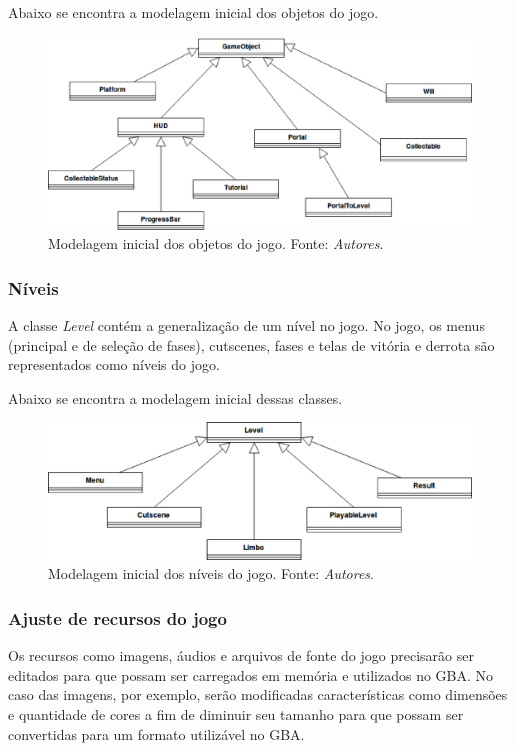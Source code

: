       Abaixo se encontra a modelagem inicial dos objetos do jogo.

      \begin{figure}[H]
        \centering \includegraphics[keepaspectratio=true,scale=0.6]{figuras/class-diagram-1.eps}
        \caption[Modelagem inicial dos objetos do jogo]
          {Modelagem inicial dos objetos do jogo. Fonte: \textit{Autores}.}
        \label{game-object-children}
      \end{figure}

    \subsubsection{Níveis}

      A classe \textit{Level} contém a generalização de um nível no jogo. No jogo, os menus (principal e de seleção de fases), cutscenes, fases e telas de vitória e derrota são representados como níveis do jogo.

      Abaixo se encontra a modelagem inicial dessas classes.

      \begin{figure}[H]
        \centering \includegraphics[keepaspectratio=true,scale=0.6]{figuras/class-diagram-2.eps}
        \caption[Modelagem inicial dos níveis do jogo]
          {Modelagem inicial dos níveis do jogo. Fonte: \textit{Autores}.}
        \label{game-object-levels}
      \end{figure}

    \subsubsection{Ajuste de recursos do jogo}

      Os recursos como imagens, áudios e arquivos de fonte do jogo precisarão ser editados para que possam ser carregados em memória e utilizados no GBA. No caso das imagens, por exemplo, serão modificadas características como dimensões e quantidade de cores a fim de diminuir seu tamanho para que possam ser convertidas para um formato utilizável no GBA.

